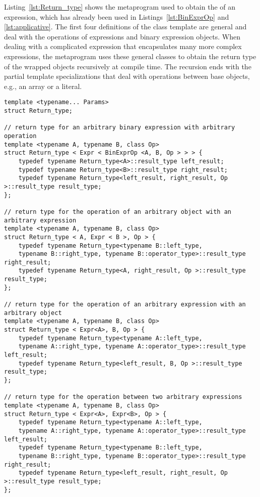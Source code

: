 \documentclass[11pt]{article}
\newcommand{\code}[1]{{\footnotesize\ttfamily{#1}}}
\begin{document}
Listing~\ref{lst:Return_type} shows the metaprogram used to obtain the \code{Return\_type} of an expression, which has already been used in Listings~\ref{lst:BinExprOp} and \ref{lst:applicative}. The first four definitions of the \code{Return\_type} class template are general and deal with the operations of expressions and binary expression objects.
When dealing with a complicated expression that encapsulates many more complex expressions, the metaprogram uses these general classes to obtain the return type of the wrapped objects recursively at compile time. 
The recursion ends with the partial template specializations that deal with operations between base objects, e.g., an array or a literal.
\begin{lstlisting}[caption={\code{Return\_type} metaprogram}, label=lst:Return_type]
template <typename... Params>
struct Return_type;

// return type for an arbitrary binary expression with arbitrary operation
template <typename A, typename B, class Op>
struct Return_type < Expr < BinExprOp <A, B, Op > > > {
    typedef typename Return_type<A>::result_type left_result;
    typedef typename Return_type<B>::result_type right_result;
    typedef typename Return_type<left_result, right_result, Op >::result_type result_type;
};

// return type for the operation of an arbitrary object with an arbitrary expression
template <typename A, typename B, class Op>
struct Return_type < A, Expr < B >, Op > {
    typedef typename Return_type<typename B::left_type,
    typename B::right_type, typename B::operator_type>::result_type right_result;
    typedef typename Return_type<A, right_result, Op >::result_type result_type;
};

// return type for the operation of an arbitrary expression with an arbitrary object 
template <typename A, typename B, class Op>
struct Return_type < Expr<A>, B, Op > {
    typedef typename Return_type<typename A::left_type,
    typename A::right_type, typename A::operator_type>::result_type left_result;
    typedef typename Return_type<left_result, B, Op >::result_type result_type;
};

// return type for the operation between two arbitrary expressions 
template <typename A, typename B, class Op>
struct Return_type < Expr<A>, Expr<B>, Op > {
    typedef typename Return_type<typename A::left_type,
    typename A::right_type, typename A::operator_type>::result_type left_result;
    typedef typename Return_type<typename B::left_type,
    typename B::right_type, typename B::operator_type>::result_type right_result;
    typedef typename Return_type<left_result, right_result, Op >::result_type result_type;
};


\end{lstlisting}
\end{document}
